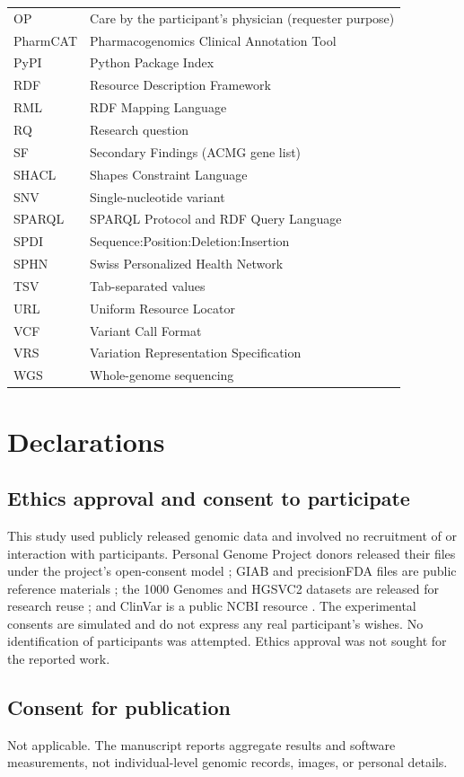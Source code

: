 \documentclass[pdflatex,sn-mathphys-num,referee]{sn-jnl}
\begin{document}
\begin{longtable}{@{}>{\raggedright\arraybackslash}p{}>{\raggedright\arraybackslash}p{}@{}}
OP & Care by the participant's physician (requester purpose)\\
PharmCAT & Pharmacogenomics Clinical Annotation Tool\\
PyPI & Python Package Index\\
RDF & Resource Description Framework\\
RML & RDF Mapping Language\\
RQ & Research question\\
SF & Secondary Findings (ACMG gene list)\\
SHACL & Shapes Constraint Language\\
SNV & Single-nucleotide variant\\
SPARQL & SPARQL Protocol and RDF Query Language\\
SPDI & Sequence:Position:Deletion:Insertion\\
SPHN & Swiss Personalized Health Network\\
TSV & Tab-separated values\\
URL & Uniform Resource Locator\\
VCF & Variant Call Format\\
VRS & Variation Representation Specification\\
WGS & Whole-genome sequencing\\
\end{longtable}

\section*{Declarations}
\subsection*{Ethics approval and consent to participate}
This study used publicly released genomic data and involved no recruitment of or interaction with participants.
Personal Genome Project donors released their files under the project's open-consent model \cite{personal_genome_proj}; GIAB and precisionFDA files are public reference materials \cite{nist_gib_2025,giab_v421_2022}; the 1000 Genomes and HGSVC2 datasets are released for research reuse \cite{thousand_genomes_2015,byrska2022highcoverage,hgsvc_2021}; and ClinVar is a public NCBI resource \cite{clinvar_vcf}.
The experimental consents are simulated and do not express any real participant's wishes.
No identification of participants was attempted.
Ethics approval was not sought for the reported work.

\subsection*{Consent for publication}
Not applicable.
The manuscript reports aggregate results and software measurements, not individual-level genomic records, images, or personal details.
\end{document}
